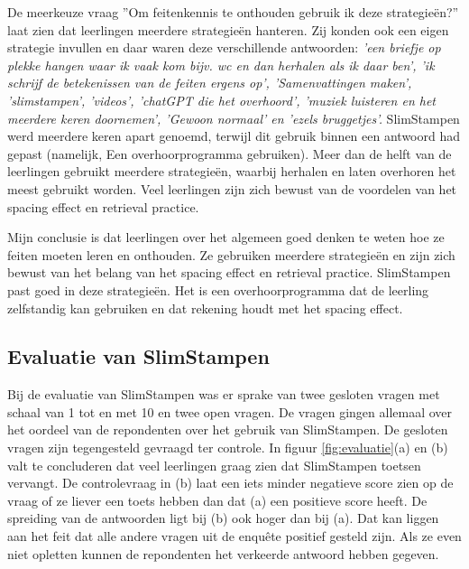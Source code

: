 \documentclass[12pt, a4paper]{article}
\begin{document}
De meerkeuze vraag ''Om feitenkennis te onthouden gebruik ik deze strategieën?'' laat zien dat leerlingen meerdere strategieën hanteren. Zij konden ook een eigen strategie invullen en daar waren deze verschillende antwoorden:
\emph{
'een briefje op plekke hangen waar ik vaak kom bijv. wc en dan herhalen als ik daar ben', 'ik schrijf de betekenissen van de feiten ergens op', 'Samenvattingen maken', 'slimstampen', 'videos', 'chatGPT die het overhoord', 'muziek luisteren en het meerdere keren doornemen', 'Gewoon normaal' en 'ezels bruggetjes'.}
SlimStampen werd meerdere keren apart genoemd, terwijl dit gebruik binnen een antwoord had gepast (namelijk, Een overhoorprogramma gebruiken). Meer dan de helft van de leerlingen gebruikt meerdere strategieën, waarbij herhalen en laten overhoren het meest gebruikt worden. Veel leerlingen zijn zich bewust van de voordelen van het spacing effect en retrieval practice.

Mijn conclusie is dat leerlingen over het algemeen goed denken te weten hoe ze feiten moeten leren en onthouden. Ze gebruiken meerdere strategieën en zijn zich bewust van het belang van het spacing effect en retrieval practice. SlimStampen past goed in deze strategieën. Het is een overhoorprogramma dat de leerling zelfstandig kan gebruiken en dat rekening houdt met het spacing effect.

\subsection[Evaluatie]{Evaluatie van SlimStampen}
Bij de evaluatie van SlimStampen was er sprake van twee gesloten vragen met schaal van 1 tot en met 10 en twee open vragen. De vragen gingen allemaal over het oordeel van de repondenten over het gebruik van SlimStampen. De gesloten vragen zijn tegengesteld gevraagd ter controle.
In figuur \ref*{fig:evaluatie}(a) en (b) valt te concluderen dat veel leerlingen graag zien dat SlimStampen toetsen vervangt. De controlevraag in (b) laat een iets minder negatieve score zien op de vraag of ze liever een toets hebben dan dat (a) een positieve score heeft. De spreiding van de antwoorden ligt bij (b) ook hoger dan bij (a). Dat kan liggen aan het feit dat alle andere vragen uit de enquête positief gesteld zijn. Als ze even niet opletten kunnen de repondenten het verkeerde antwoord hebben gegeven.
\end{document}
